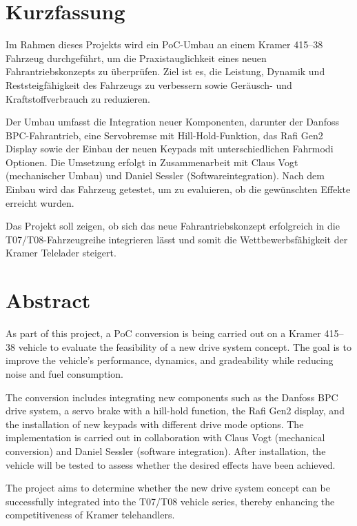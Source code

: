 \documentclass[a4paper, 12pt]{article} %
\begin{document}
\rmfamily

\clearpage

\section*{Kurzfassung}
\begin{spacing}{1.8}  %
    \fontsize{14pt}{14pt}\selectfont  %
    Im Rahmen dieses Projekts wird ein \acf{PoC}-Umbau an einem Kramer 415–38 Fahrzeug durchgeführt, 
    um die Praxistauglichkeit eines neuen Fahrantriebskonzepts zu überprüfen. Ziel ist es, die Leistung, 
    Dynamik und Reststeigfähigkeit des Fahrzeugs zu verbessern sowie Geräusch- und Kraftstoffverbrauch zu reduzieren.

    Der Umbau umfasst die Integration neuer Komponenten, darunter der Danfoss \ac{BPC}-Fahrantrieb, 
    eine Servobremse mit Hill-Hold-Funktion, das Rafi Gen2 Display sowie der Einbau der neuen Keypads 
    mit unterschiedlichen Fahrmodi Optionen. Die Umsetzung erfolgt in Zusammenarbeit mit Claus Vogt (mechanischer Umbau) und 
    Daniel Sessler (Softwareintegration). Nach dem Einbau wird das Fahrzeug getestet, um zu evaluieren, ob die gewünschten Effekte erreicht wurden.
    
    Das Projekt soll zeigen, ob sich das neue Fahrantriebskonzept erfolgreich in die T07/T08-Fahrzeugreihe integrieren lässt und somit die Wettbewerbsfähigkeit der Kramer Telelader steigert.
\end{spacing}

\clearpage
\section*{Abstract}
\begin{spacing}{1.8}  %
    \fontsize{14pt}{14pt}\selectfont  %
    As part of this project, a \acf{PoC} conversion is being carried out on a Kramer 415–38 
    vehicle to evaluate the feasibility of a new drive system concept. The goal is to 
    improve the vehicle's performance, dynamics, and gradeability while reducing noise and fuel consumption.

    The conversion includes integrating new components such as the Danfoss \ac{BPC} drive system, 
    a servo brake with a hill-hold function, the Rafi Gen2 display, and the installation of new 
    keypads with different drive mode options. The implementation is carried out in collaboration with Claus Vogt 
    (mechanical conversion) and Daniel Sessler (software integration). After installation, the vehicle 
    will be tested to assess whether the desired effects have been achieved.
    
    The project aims to determine whether the new drive system concept can be successfully 
    integrated into the T07/T08 vehicle series, thereby enhancing the competitiveness of Kramer telehandlers.

\end{spacing}
\clearpage
\end{document}
